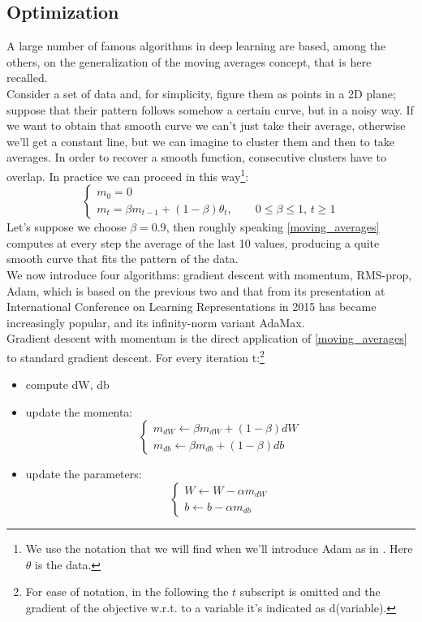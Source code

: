 \documentclass[12pt, a4paper]{report}
\theoremstyle{definition}
\begin{document}
\subsection{Optimization}\label{par1.2.2}
A large number of famous algorithms  in deep learning are based, among the others, on the generalization of the moving averages concept, that is here recalled.\\
Consider a set of data and, for simplicity, figure them as points in a 2D plane; suppose that their pattern follows somehow a certain curve, but in a noisy way. If we want to obtain that smooth curve we can't just take their average, otherwise we'll get a constant line, but we can imagine to cluster them and then to take averages. In order to recover a smooth function, consecutive clusters have to overlap. In practice we can proceed in this way\footnote{We use the notation that we will find when we'll introduce Adam as in \cite{Kingma}. Here $\theta$ is the data. }:
\begin{equation}\label{moving_averages}
\begin{cases}
m_0=0\\
m_t=\beta m_{t-1} + (1-\beta) \theta_t, \quad\quad 0\le\beta\le 1, \, t\geq 1
\end{cases}
\end{equation}
Let's suppose we choose $\beta=0.9$, then roughly speaking \eqref{moving_averages}  computes at every step the average of the last 10 values, producing a quite smooth curve that fits the pattern of the data.\\
\newline \noindent We now introduce four algorithms: gradient descent with momentum, RMS-prop, Adam, which is based on the previous two and that from its presentation at International Conference on Learning Representations in 2015 has became increasingly popular, and its infinity-norm variant AdaMax.\\
\newline \noindent Gradient descent with momentum is the direct application of \eqref{moving_averages} to standard gradient descent. For every iteration t:\footnote{For ease of notation, in the following the $t$ subscript is omitted and the gradient of the objective w.r.t. to a variable it's indicated as d(variable). }
\begin{itemize}\label{momentum}
	\item compute dW, db
	\item update the momenta: 
	\begin{equation}
	\begin{cases}
	m_{dW}\longleftarrow\beta m_{dW} + (1-\beta) dW\\
	m_{db}\longleftarrow\beta m_{db} + (1-\beta) db
	\end{cases}
	\end{equation}
	\item update the parameters:
	\begin{equation}
	\begin{cases}
	W\longleftarrow W - \alpha m_{dW}\\
	b\longleftarrow b - \alpha m_{db}
	\end{cases}
	\end{equation}
\end{itemize}
\end{document}
